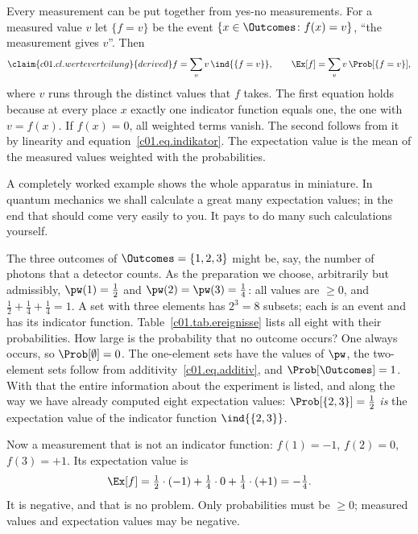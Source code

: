 Every measurement can be put together from yes-no measurements. For a measured value $v$
let $\{f = v\}$ be the event $\{x \in \Outcomes \colon f(x) = v\}$, “the measurement gives
$v$”. Then
\begin{equation}\label{c01.eq.werteverteilung}\claim{c01.cl.werteverteilung}{derived}
  f = \sum_{v} v\, \ind{\{f = v\}},
  \qquad
  \Ex[f] = \sum_{v} v\, \Prob[\{f = v\}] ,
\end{equation}
where $v$ runs through the distinct values that $f$ takes. The first equation holds
because at every place $x$ exactly one indicator function equals one, the one with
$v = f(x)$. If $f(x) = 0$, all weighted terms vanish. The second follows from it by linearity and equation~\eqref{c01.eq.indikator}. The
expectation value is the mean of the measured values weighted with the probabilities.

A completely worked example shows the whole apparatus in miniature. In quantum mechanics we
shall calculate a great many expectation values; in the end that should come very easily to
you. It pays to do many such calculations yourself.

\begin{example}\label{c01.ex.drei-ergebnisse}
  The three outcomes of $\Outcomes = \{1, 2, 3\}$ might be, say, the number of photons that a
  detector counts. As the preparation we choose, arbitrarily but admissibly,
  $\pw(1) = \tfrac12$ and $\pw(2) = \pw(3) = \tfrac14$: all values are $\geq 0$, and
  $\tfrac12 + \tfrac14 + \tfrac14 = 1$. A set with three elements has $2^3 = 8$ subsets;
  each is an event and has its indicator function. Table~\ref{c01.tab.ereignisse} lists all
  eight with their probabilities. How large is the probability that no outcome occurs? One
  always occurs, so $\Prob[\emptyset] = 0$. The one-element sets have the values of $\pw$,
  the two-element sets follow from additivity~\eqref{c01.eq.additiv}, and
  $\Prob[\Outcomes] = 1$. With that the entire information about the experiment is listed,
  and along the way we have already computed eight expectation values:
  $\Prob[\{2,3\}] = \tfrac12$ \emph{is} the expectation value of the indicator function
  $\ind{\{2,3\}}$.

  Now a measurement that is not an indicator function: $f(1) = -1$, $f(2) = 0$,
  $f(3) = +1$. Its expectation value is
  \begin{equation}\label{c01.eq.drei-ergebnisse}
    \Ex[f] = \tfrac12\cdot(-1) + \tfrac14\cdot 0 + \tfrac14\cdot(+1) = -\tfrac14 .
  \end{equation}
  It is negative, and that is no problem. Only probabilities must be $\geq 0$; measured
  values and expectation values may be negative.
\end{example}

